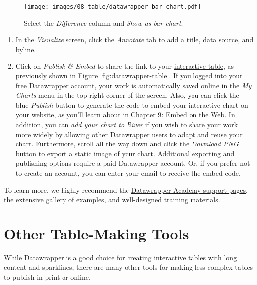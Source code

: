 \documentclass[
  english,
]{book}
\begin{document}
\begin{figure}
\centering
\texttt{[image: images/08-table/datawrapper-bar-chart.pdf]}
\caption{\label{fig:datawrapper-bar-chart}Select the \emph{Difference} column and \emph{Show as bar chart}.}
\end{figure}

\begin{enumerate}
\def\labelenumi{\arabic{enumi}.}
\setcounter{enumi}{12}
\item
  In the \emph{Visualize} screen, click the \emph{Annotate} tab to add a title, data source, and byline.
\item
  Click on \emph{Publish \& Embed} to share the link to your \href{https://datawrapper.dwcdn.net/0HK4f/2/}{interactive table}, as previously shown in Figure \ref{fig:datawrapper-table}. If you logged into your free Datawrapper account, your work is automatically saved online in the \emph{My Charts} menu in the top-right corner of the screen. Also, you can click the blue \emph{Publish} button to generate the code to embed your interactive chart on your website, as you'll learn about in \href{embed.html}{Chapter 9: Embed on the Web}. In addition, you can \emph{add your chart to River} if you wish to share your work more widely by allowing other Datawrapper users to adapt and reuse your chart. Furthermore, scroll all the way down and click the \emph{Download PNG} button to export a static image of your chart. Additional exporting and publishing options require a paid Datawrapper account. Or, if you prefer not to create an account, you can enter your email to receive the embed code.
\end{enumerate}

To learn more, we highly recommend the \href{https://academy.datawrapper.de/}{Datawrapper Academy support pages}, the extensive \href{https://www.datawrapper.de/tables/}{gallery of examples}, and well-designed \href{https://www.datawrapper.de/training-materials/}{training materials}.

\hypertarget{other-table-tools}{%
\section*{Other Table-Making Tools}\label{other-table-tools}}

While Datawrapper is a good choice for creating interactive tables with long content and sparklines, there are many other tools for making less complex tables to publish in print or online.
\end{document}
